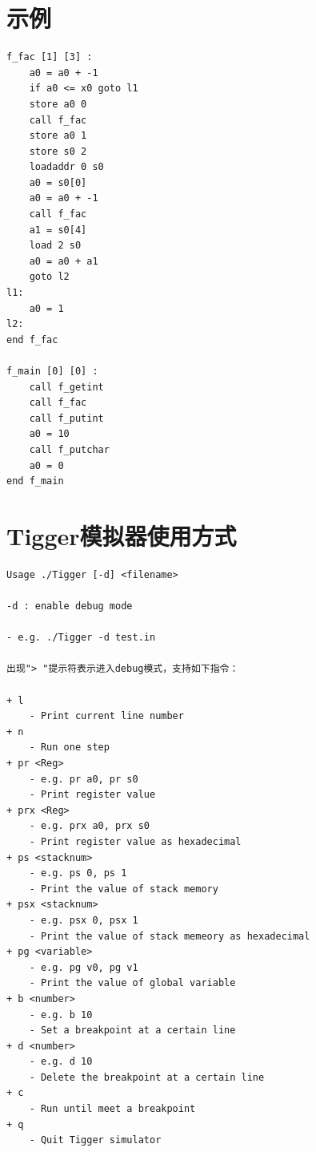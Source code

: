 \documentclass{ctexart}
\newenvironment{typewriterfont}{\ttfamily}{\par}
\begin{document}
\newpage
\section{示例}
\begin{typewriterfont}
\begin{lstlisting}
f_fac [1] [3] :
    a0 = a0 + -1
    if a0 <= x0 goto l1
    store a0 0
    call f_fac
    store a0 1
    store s0 2
    loadaddr 0 s0
    a0 = s0[0]
    a0 = a0 + -1
    call f_fac
    a1 = s0[4]
    load 2 s0
    a0 = a0 + a1
    goto l2
l1:
    a0 = 1
l2:
end f_fac

f_main [0] [0] :
    call f_getint
    call f_fac
    call f_putint
    a0 = 10
    call f_putchar
    a0 = 0
end f_main
\end{lstlisting}
\end{typewriterfont}

\newpage
\section{Tigger模拟器使用方式}
\begin{typewriterfont}
\begin{lstlisting}
Usage ./Tigger [-d] <filename>

-d : enable debug mode

- e.g. ./Tigger -d test.in

出现"> "提示符表示进入debug模式，支持如下指令：

+ l
    - Print current line number
+ n
    - Run one step
+ pr <Reg>
    - e.g. pr a0, pr s0
    - Print register value
+ prx <Reg>
    - e.g. prx a0, prx s0
    - Print register value as hexadecimal
+ ps <stacknum>
    - e.g. ps 0, ps 1
    - Print the value of stack memory
+ psx <stacknum>
    - e.g. psx 0, psx 1
    - Print the value of stack memeory as hexadecimal
+ pg <variable>
    - e.g. pg v0, pg v1
    - Print the value of global variable
+ b <number>
    - e.g. b 10
    - Set a breakpoint at a certain line
+ d <number>
    - e.g. d 10
    - Delete the breakpoint at a certain line
+ c
    - Run until meet a breakpoint
+ q
    - Quit Tigger simulator
\end{lstlisting}
\end{typewriterfont}
\end{document}
